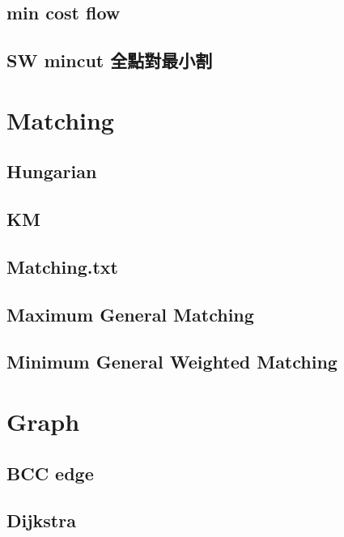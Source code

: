 	\subsection{min cost flow}
		
	\subsection{SW mincut 全點對最小割}
		


\section{Matching}
	\subsection{Hungarian}
		
	\subsection{KM}
		
	\subsection{Matching.txt}
		
	\subsection{Maximum General Matching}
		
	\subsection{Minimum General Weighted Matching}
		


\section{Graph}
		
	\subsection{BCC edge}
		
	\subsection{Dijkstra}
		
%		
